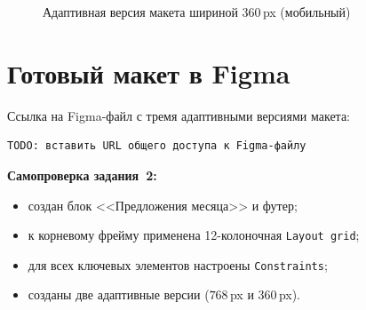 \begin{figure}[h]
  \centering
  \caption{Адаптивная версия макета шириной \(360\,\)px (мобильный)}
  \label{fig:mobile}
\end{figure}

\section{Готовый макет в Figma}

Ссылка на Figma-файл с тремя адаптивными версиями макета:

\begin{lstlisting}
TODO: вставить URL общего доступа к Figma-файлу
\end{lstlisting}

\textbf{Самопроверка задания~2:}
\begin{itemize}
  \item создан блок <<Предложения месяца>> и футер;
  \item к корневому фрейму применена 12-колоночная \texttt{Layout grid};
  \item для всех ключевых элементов настроены \texttt{Constraints};
  \item созданы две адаптивные версии (\(768\,\)px и \(360\,\)px).
\end{itemize}

\endinput
